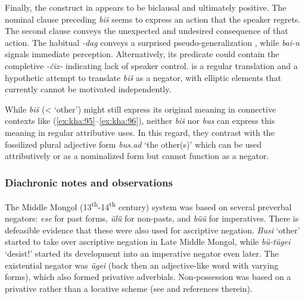 \documentclass[output=paper,colorlinks,citecolor=brown,chinesefont]{langscibook}
\begin{document}
Finally, the construct in  appears to be biclausal and ultimately positive. The nominal clause preceding \textit{biš} seems to express an action that the speaker regrets. The second clause conveys the unexpected and undesired consequence of that action. The habitual \textit{-dag} conveys a surprised pseudo-generalization \citep[esp. 93--96]{Brosig2015Aspect}, while \textit{bai-n} signals immediate perception. Alternatively, its predicate could contain the completive \textit{-čix-} indicating lack of speaker control.  is a regular translation and  a hypothetic attempt to translate \textit{biš} as a negator, with elliptic elements that currently cannot be motivated independently.


While \textit{biš} (< ‘other’) might still express its original meaning in connective contexts like (\ref{ex:kha:95}--\ref{ex:kha:96}), neither \textit{biš} nor \textit{bus} can express this meaning in regular attributive uses. In this regard, they contrast with the fossilized plural adjective form \textit{bus.ad} ‘the other(s)’ which can be used attributively or as a nominalized form but cannot function as a negator. 

\subsubsection{Diachronic notes and observations}\label{sec:kha:4.6.4}
\largerpage

The Middle Mongol (13\textsuperscript{th}{}-14\textsuperscript{th} century) system was based on several preverbal negators: \textit{ese} for past forms, \textit{ülü} for non-pasts, and \textit{büü} for imperatives. There is defeasible evidence that these were also used for ascriptive negation. \textit{Busi} ‘other’ started to take over ascriptive negation in Late Middle Mongol, while \textit{bü-tügei} ‘desist!’ started its development into an imperative negator even later. The existential negator was \textit{ügei} (back then an adjective-like word with varying forms), which also formed privative adverbials. Non-possession was based on a privative rather than a locative scheme (see \citealt{Brosig2015Negation} and references therein). %
\end{document}
